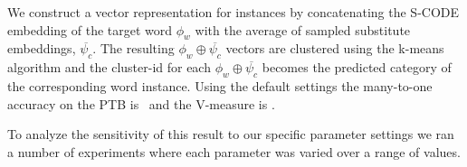 We construct a vector representation for instances by concatenating the S-CODE
embedding of the target word $\phi_w$ with the average of sampled substitute
embeddings, $\overline{\psi_c}$.  The resulting $\phi_w \oplus
\overline{\psi_c}$ vectors are clustered using the k-means algorithm and the
cluster-id for each $\phi_w \oplus \overline{\psi_c}$ becomes the predicted
category of the corresponding word instance.  Using the default settings the
many-to-one accuracy on the PTB is \fwsxymto\ and the V-measure is \fwsxyvm.

To analyze the sensitivity of this result to our specific parameter
settings we ran a number of experiments where each parameter was
varied over a range of values.

